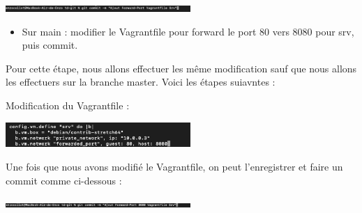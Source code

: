 \documentclass[12pt]{article}
\begin{document}
\vspace{0.3cm}

\begin{center}
  \includegraphics[width=7cm]{Image-TD-Git-4/commit-1.png}
\end{center}

\vspace{0.3cm}

\begin{itemize}
  \item Sur main : modifier le Vagrantfile pour forward le port 80 vers 8080 pour srv, puis commit.
\end{itemize}

\vspace{0.3cm}

Pour cette étape, nous allons effectuer les même modification sauf que nous allons les effectuers sur la branche master. Voici les étapes suiavntes : 

\vspace{0.3cm}

\vspace{0.3cm}

Modification du Vagrantfile : 

\vspace{0.3cm}

\begin{center}
  \includegraphics[width=7cm]{Image-TD-Git-4/Forward-port-2.png}
\end{center}

\vspace{0.3cm}

Une fois que nous avons modifié le Vagrantfile, on peut l'enregistrer et faire un commit comme ci-dessous :

\vspace{0.3cm}

\begin{center}
  \includegraphics[width=7cm]{Image-TD-Git-4/commit-2.png}
\end{center}

\vspace{0.3cm}

\newpage
\end{document}

